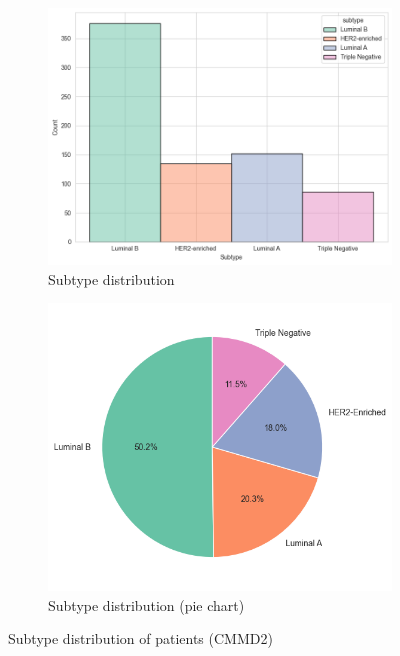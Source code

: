\documentclass[a4paper,10pt]{book}
\begin{document}
\begin{figure}[h!]
	\centering
	\begin{subfigure}[t]{0.49\textwidth}
		\centering
		\includegraphics[width=\textwidth]{reports//assets/hist.png}
		\caption{Subtype distribution}
		\label{fig:subtype_hist}
	\end{subfigure}
	\begin{subfigure}[t]{0.49\textwidth}
		\centering
		\includegraphics[width=\textwidth]{reports/assets/pie.png}
		\caption{Subtype distribution (pie chart)}
		\label{fig:subtype_pie}
	\end{subfigure}
	\caption[CMMD2 molecular subtypes distribution]{Subtype distribution of patients (CMMD2)}
	\label{fig:subtype_charts}
\end{figure}
\end{document}
